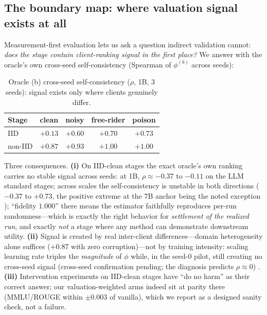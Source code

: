 \subsection{The boundary map: where valuation signal exists at all}
\label{sec:results-boundary}

Measurement-first evaluation lets us ask a question indirect validation cannot:
\emph{does the stage contain client-ranking signal in the first place?} We
answer with the oracle's own cross-seed self-consistency (Spearman of
$\phi^{(b)}$ across seeds):

\begin{table}[h]
\centering
\caption{Oracle (b) cross-seed self-consistency ($\rho$, 1B, 3 seeds): signal
exists only where clients genuinely differ.
\protect{}}
\label{tab:baxis}
\small
\begin{tabular}{lcccc}
\toprule
Stage & clean & noisy & free-rider & poison \\
\midrule
IID     & $+0.13$ & $+0.60$ & $+0.70$ & $+0.73$ \\
non-IID & $+0.87$ & $+0.93$ & $+1.00$ & $+1.00$ \\
\bottomrule
\end{tabular}
\end{table}

Three consequences. \textbf{(i)} On IID-clean stages the exact oracle's own
ranking carries no stable signal across seeds: at 1B, $\rho \approx -0.37$ to
$-0.11$ on the LLM standard stages; across scales the self-consistency is
unstable in both directions ($-0.37$ to $+0.73$, the positive extreme at the
7B anchor being the noted exception );
``fidelity $1.000$'' there means the estimator
faithfully reproduces per-run randomness---which is exactly the right behavior
for \emph{settlement of the realized run}, and exactly \emph{not} a stage where
any method can demonstrate downstream utility. \textbf{(ii)} Signal is created
by real inter-client differences---domain heterogeneity alone suffices
($+0.87$ with zero corruption)---not by training intensity: scaling learning
rate triples the \emph{magnitude} of $\phi$ while, in the seed-0 pilot, still
creating no cross-seed signal (cross-seed confirmation pending; the diagnosis
predicts $\rho \approx 0$) . \textbf{(iii)} Intervention experiments on
IID-clean stages have ``do no harm'' as their correct answer; our
valuation-weighted arms indeed sit at parity there (MMLU/ROUGE within
$\pm0.003$ of vanilla), which we report as a designed sanity check, not a
failure.


